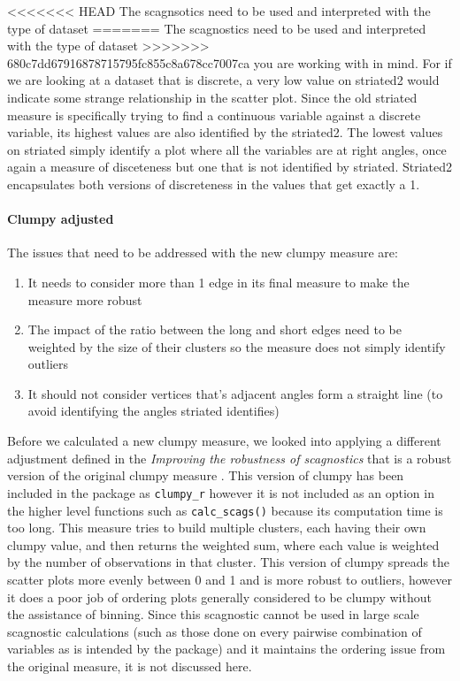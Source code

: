<<<<<<< HEAD
The scagnsotics need to be used and interpreted with the type of dataset
=======
The scagnostics need to be used and interpreted with the type of dataset
>>>>>>> 680c7dd67916878715795fc855c8a678cc7007ca
you are working with in mind. For if we are looking at a dataset that is
discrete, a very low value on striated2 would indicate some strange
relationship in the scatter plot. Since the old striated measure is
specifically trying to find a continuous variable against a discrete
variable, its highest values are also identified by the striated2. The
lowest values on striated simply identify a plot where all the variables
are at right angles, once again a measure of disceteness but one that is
not identified by striated. Striated2 encapsulates both versions of
discreteness in the values that get exactly a 1.

\hypertarget{clumpy-adjusted}{%
\paragraph{Clumpy adjusted}\label{clumpy-adjusted}}

The issues that need to be addressed with the new clumpy measure are:

\begin{enumerate}
\def\labelenumi{\arabic{enumi}.}
\tightlist
\item
  It needs to consider more than 1 edge in its final measure to make the
  measure more robust
\item
  The impact of the ratio between the long and short edges need to be
  weighted by the size of their clusters so the measure does not simply
  identify outliers
\item
  It should not consider vertices that's adjacent angles form a straight
  line (to avoid identifying the angles striated identifies)
\end{enumerate}

Before we calculated a new clumpy measure, we looked into applying a
different adjustment defined in the \emph{Improving the robustness of
scagnostics} that is a robust version of the original clumpy measure
\citep{robust}. This version of clumpy has been included in the package
as \texttt{clumpy\_r} however it is not included as an option in the
higher level functions such as \texttt{calc\_scags()} because its
computation time is too long. This measure tries to build multiple
clusters, each having their own clumpy value, and then returns the
weighted sum, where each value is weighted by the number of observations
in that cluster. This version of clumpy spreads the scatter plots more
evenly between 0 and 1 and is more robust to outliers, however it does a
poor job of ordering plots generally considered to be clumpy without the
assistance of binning. Since this scagnostic cannot be used in large
scale scagnostic calculations (such as those done on every pairwise
combination of variables as is intended by the package) and it maintains
the ordering issue from the original measure, it is not discussed here.

